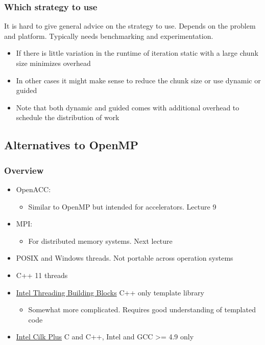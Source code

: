 \subsubsection{Which strategy to use}\label{which-strategy-to-use}

It is hard to give general advice on the strategy to use. Depends on the
problem and platform. Typically needs benchmarking and experimentation.

\begin{itemize}
\itemsep1pt\parskip0pt
\item
  If there is little variation in the runtime of iteration static with a
  large chunk size minimizes overhead
\item
  In other cases it might make sense to reduce the chunk size or use
  dynamic or guided
\item
  Note that both dynamic and guided comes with additional overhead to
  schedule the distribution of work
\end{itemize}

\subsection{Alternatives to OpenMP}\label{alternatives-to-openmp}

\subsubsection{Overview}\label{overview}

\begin{itemize}
\itemsep1pt\parskip0pt
\item
  OpenACC:

  \begin{itemize}
  \itemsep1pt\parskip0pt
  \item
    Similar to OpenMP but intended for accelerators. Lecture 9
  \end{itemize}
\item
  MPI:

  \begin{itemize}
  \itemsep1pt\parskip0pt
  \item
    For distributed memory systems. Next lecture
  \end{itemize}
\item
  POSIX and Windows threads. Not portable across operation systems
\item
  C++ 11 threads
\item
  \href{http://threadingbuildingblocks.org/}{Intel Threading Building
  Blocks} C++ only template library

  \begin{itemize}
  \itemsep1pt\parskip0pt
  \item
    Somewhat more complicated. Requires good understanding of templated
    code
  \end{itemize}
\item
  \href{https://www.cilkplus.org/}{Intel Cilk Plus} C and C++, Intel and
  GCC \textgreater{}= 4.9 only
\end{itemize}

